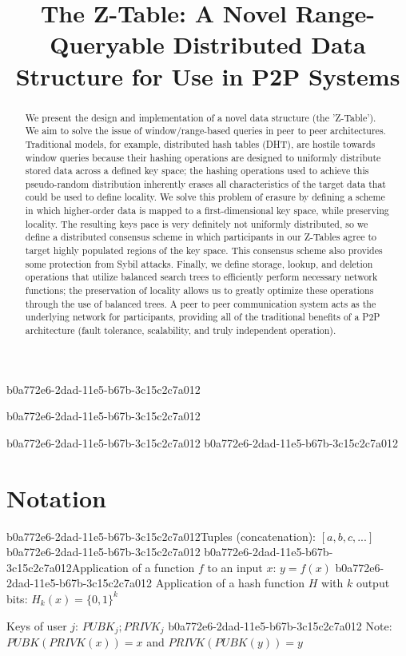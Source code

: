 \documentclass[12pt]{article}
\title{The Z-Table: A Novel Range-Queryable Distributed Data Structure for Use in P2P Systems}
\begin{document}
b0a772e6-2dad-11e5-b67b-3c15c2c7a012\maketitle
b0a772e6-2dad-11e5-b67b-3c15c2c7a012
\begin{abstract}
We present the design and implementation of a novel data structure (the 'Z-Table'). We aim to solve the issue of window/range-based queries in peer to peer architectures. Traditional models, for example,  distributed hash tables (DHT), are hostile towards window queries because their hashing operations are designed to uniformly distribute stored data across a defined key space; the hashing operations used to achieve this pseudo-random distribution inherently erases all characteristics of the target data that could be used to define locality. We solve this problem of erasure by defining a scheme in which higher-order data is mapped to a first-dimensional key space, while preserving locality. The resulting keys pace is very definitely not uniformly distributed, so we define a distributed consensus scheme in which participants in our Z-Tables agree to target highly populated regions of the key space. This consensus scheme also provides some protection from Sybil attacks. Finally, we define storage, lookup, and deletion operations that utilize balanced search trees to efficiently perform necessary network functions; the preservation of locality allows us to greatly optimize these operations through the use of balanced trees. A peer to peer communication system acts as the underlying network for participants, providing all of the traditional benefits of a P2P architecture (fault tolerance, scalability, and truly independent operation).
\end{abstract}
b0a772e6-2dad-11e5-b67b-3c15c2c7a012
b0a772e6-2dad-11e5-b67b-3c15c2c7a012\section{Notation}

b0a772e6-2dad-11e5-b67b-3c15c2c7a012Tuples (concatenation): $[a,b,c,...]$
b0a772e6-2dad-11e5-b67b-3c15c2c7a012
b0a772e6-2dad-11e5-b67b-3c15c2c7a012Application of a function $f$ to an input $x$: $y=f(x)$
b0a772e6-2dad-11e5-b67b-3c15c2c7a012
Application of a hash function $H$ with $k$ output bits: $H_{k}(x) = \{0,1\}^k$

Keys of user $j$: $ PUBK_j; PRIVK_j $
b0a772e6-2dad-11e5-b67b-3c15c2c7a012
Note: $PUBK(PRIVK(x)) = x$ and $PRIVK(PUBK(y)) = y$~
\end{document}
